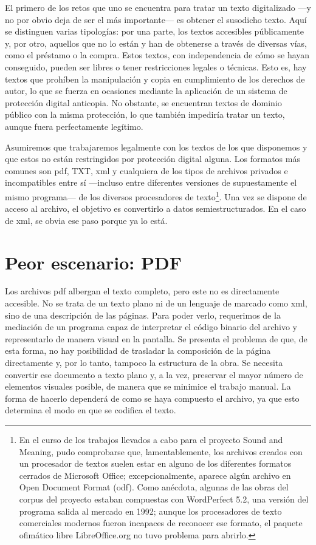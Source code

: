 El primero de los retos que uno se encuentra para tratar un texto digitalizado —y no por obvio deja de ser el más importante— es obtener el susodicho texto. Aquí se distinguen varias tipologías: por una parte, los textos accesibles públicamente y, por otro, aquellos que no lo están y han de obtenerse a través de diversas vías, como el préstamo o la compra. Estos textos, con independencia de cómo se hayan conseguido, pueden ser libres o tener restricciones legales o técnicas. Esto es, hay textos que prohíben la manipulación y copia en cumplimiento de los derechos de autor, lo que se fuerza en ocasiones mediante la aplicación de un sistema de protección digital anticopia. No obstante, se encuentran textos de dominio público con la misma protección, lo que también impediría tratar un texto, aunque fuera perfectamente legítimo.

Asumiremos que trabajaremos legalmente con los textos de los que disponemos y que estos no están restringidos por protección digital alguna. Los formatos más comunes son \ac{pdf}, TXT, \ac{xml} y cualquiera de los tipos de archivos privados e incompatibles entre sí —incluso entre diferentes versiones de supuestamente el mismo programa— de los diversos procesadores de texto\footnote{En el curso de los trabajos llevados a cabo para el proyecto Sound and Meaning, pudo comprobarse que, lamentablemente, los archivos creados con un procesador de textos suelen estar en alguno de los diferentes formatos cerrados de Microsoft Office; excepcionalmente, aparece algún archivo en Open Document Format (\ac{odf}). Como anécdota, algunas de las obras del corpus del proyecto estaban compuestas con WordPerfect 5.2, una versión del programa salida al mercado en 1992; aunque los procesadores de texto comerciales modernos fueron incapaces de reconocer ese formato, el paquete ofimático libre LibreOffice.org no tuvo problema para abrirlo.}. Una vez se dispone de acceso al archivo, el objetivo es convertirlo a datos semiestructurados. En el caso de \ac{xml}, se obvia ese paso porque ya lo está.

\section{Peor escenario: PDF}
Los archivos \ac{pdf} albergan el texto completo, pero este no es directamente accesible. No se trata de un texto plano ni de un lenguaje de marcado como \ac{xml}, sino de una descripción de las páginas. Para poder verlo, requerimos de la mediación de un programa capaz de interpretar el código binario del archivo y representarlo de manera visual en la pantalla. Se presenta el problema de que, de esta forma, no hay posibilidad de trasladar la composición de la página directamente y, por lo tanto, tampoco la estructura de la obra. Se necesita convertir ese documento a texto plano y, a la vez, preservar el mayor número de elementos visuales posible, de manera que se minimice el trabajo manual. La forma de hacerlo dependerá de como se haya compuesto el archivo, ya que esto determina el modo en que se codifica el texto.

